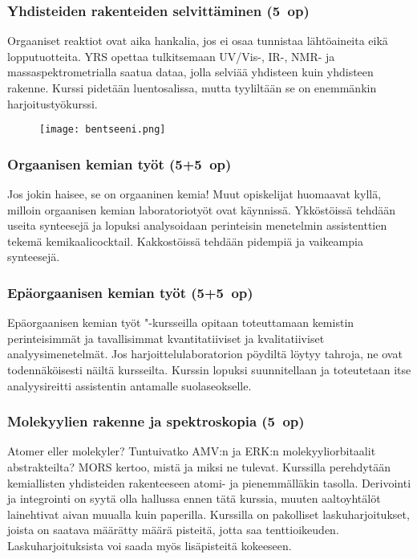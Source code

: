 \documentclass[../ala_hataile.tex]{subfiles}
\begin{document}
	\subsubsection*{Yhdisteiden rakenteiden selvittäminen (5~op)}
	Orgaaniset reaktiot ovat aika hankalia, jos ei osaa tunnistaa lähtöaineita eikä lopputuotteita.
	YRS opettaa tulkitsemaan
	UV/Vis-, IR-, NMR- ja massa\-spektro\-metrialla
	saatua dataa, jolla selviää yhdisteen
	kuin yhdisteen rakenne. Kurssi pidetään
	luentosalissa, mutta tyyliltään se on enemmänkin
	harjoitustyökurssi.
	
	\begin{figure}[!b]
		\centering
		\texttt{[image: bentseeni.png]}
	\end{figure}
	\subsubsection*{Orgaanisen kemian työt (5+5~op)}
	Jos jokin haisee, se on orgaaninen kemia!
	Muut opiskelijat huomaavat kyllä,
	milloin orgaanisen kemian laboratoriotyöt
	ovat käynnissä. Ykköstöissä tehdään useita
	synteesejä ja lopuksi analysoidaan perinteisin
	menetelmin assistenttien tekemä kemikaalicocktail.
	Kakkostöissä tehdään pidempiä ja vaikeampia synteesejä.
	
	\subsubsection*{Epäorgaanisen kemian työt (5+5~op)}
	Epäorgaanisen kemian työt "-kursseilla opitaan
	toteuttamaan kemistin perinteisimmät ja 
	tavallisimmat kvantitatiiviset ja kvalitatiiviset
	analyysimenetelmät. Jos harjoittelulaboratorion
	pöydiltä löytyy tahroja, ne ovat todennäköisesti
	näiltä kursseilta. Kurssin lopuksi suunnitellaan ja toteutetaan
	itse analyysireitti assistentin antamalle suolaseokselle.
	\subsubsection*{Molekyylien rakenne ja spektroskopia (5~op)}
	Atomer eller molekyler? Tuntuivatko
	AMV:n ja ERK:n molekyyliorbitaalit abstrakteilta?
	MORS kertoo, mistä ja miksi ne
	tulevat. Kurssilla perehdytään kemiallisten
	yhdisteiden rakenteeseen atomi- ja pienemmälläkin
	tasolla. Derivointi ja integrointi
	on syytä olla hallussa ennen tätä kurssia,
	muuten aaltoyhtälöt lainehtivat aivan muualla
	kuin paperilla. Kurssilla on pakolliset
	laskuharjoitukset, joista on saatava määrätty
	määrä pisteitä, jotta saa tenttioikeuden.
	Laskuharjoituksista voi saada myös lisäpisteitä
	kokeeseen.
\end{document}
